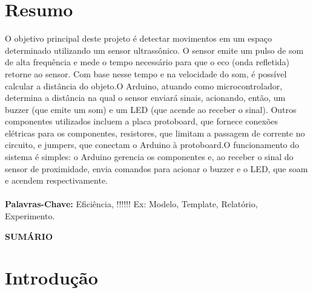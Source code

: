 \documentclass[a4paper,12pt]{article}
\begin{document}
\section*{Resumo}
\label{sec:resumo}

O objetivo principal deste projeto é detectar movimentos em um espaço determinado utilizando um sensor ultrassônico. O sensor emite um pulso de som de alta frequência e mede o tempo necessário para que o eco (onda refletida) retorne ao sensor. Com base nesse tempo e na velocidade do som, é possível calcular a distância do objeto.O Arduino, atuando como microcontrolador, determina a distância na qual o sensor enviará sinais, acionando, então, um buzzer (que emite um som) e um LED (que acende ao receber o sinal). Outros componentes utilizados incluem a placa protoboard, que fornece conexões elétricas para os componentes, resistores, que limitam a passagem de corrente no circuito, e jumpers, que conectam o Arduino à protoboard.O funcionamento do sistema é simples: o Arduino gerencia os componentes e, ao receber o sinal do sensor de proximidade, envia comandos para acionar o buzzer e o LED, que soam e acendem respectivamente.   \\ \\

\textbf{Palavras-Chave: } Eficiência, !!!!!!
Ex: Modelo, Template, Relatório, Experimento.

\newpage
\begin{center}
    {\LARGE \textbf{SUMÁRIO}} %
\end{center}
\vspace{1cm}

\begingroup
    \hypersetup{hidelinks}
    \renewcommand{\contentsname}{} %
    \tableofcontents
\endgroup


\newpage
\section{Introdução}
\label{sec:introd}
\end{document}

